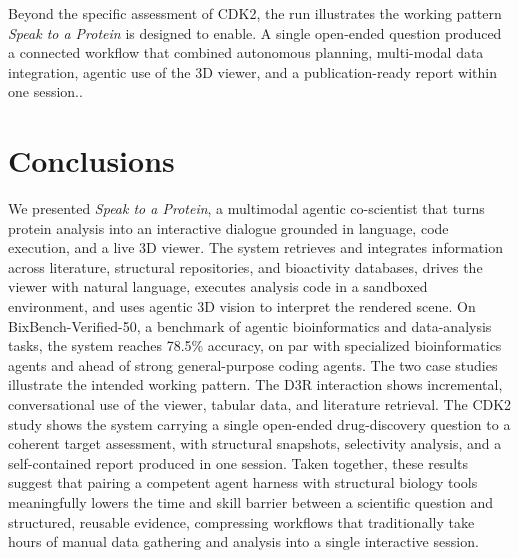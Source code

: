 \documentclass[journal=jcisd8,manuscript=article]{achemso}
\begin{document}
Beyond the specific assessment of CDK2, the run illustrates the working pattern \emph{Speak to a Protein} is designed to enable. A single open-ended question produced a connected workflow that combined autonomous planning, multi-modal data integration, agentic use of the 3D viewer, and a publication-ready report within one session..

\section{Conclusions}\label{sec:discussion}

We presented \emph{Speak to a Protein}, a multimodal agentic co-scientist that turns protein analysis into an interactive dialogue grounded in language, code execution, and a live 3D viewer. The system retrieves and integrates information across literature, structural repositories, and bioactivity databases, drives the viewer with natural language, executes analysis code in a sandboxed environment, and uses agentic 3D vision to interpret the rendered scene. On BixBench-Verified-50, a benchmark of agentic bioinformatics and data-analysis tasks, the system reaches 78.5\% accuracy, on par with specialized bioinformatics agents and ahead of strong general-purpose coding agents. The two case studies illustrate the intended working pattern. The D3R interaction shows incremental, conversational use of the viewer, tabular data, and literature retrieval. The CDK2 study shows the system carrying a single open-ended drug-discovery question to a coherent target assessment, with structural snapshots, selectivity analysis, and a self-contained report produced in one session. Taken together, these results suggest that pairing a competent agent harness with structural biology tools meaningfully lowers the time and skill barrier between a scientific question and structured, reusable evidence, compressing workflows that traditionally take hours of manual data gathering and analysis into a single interactive session.


\end{document}
